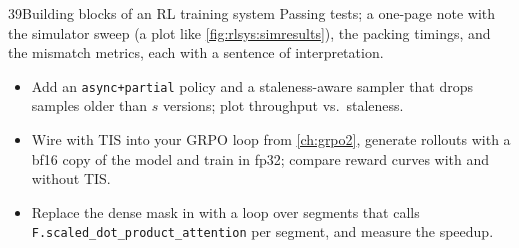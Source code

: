 \begin{labbox}{39}{Building blocks of an RL training system}
Passing tests; a one-page note with the simulator sweep (a plot like
\cref{fig:rlsys:simresults}), the packing timings, and the mismatch metrics, each with a
sentence of interpretation.

\begin{itemize}
\item Add an \texttt{async+partial} policy and a staleness-aware sampler that drops samples
older than $s$ versions; plot throughput vs.\ staleness.
\item Wire  with TIS into your GRPO loop from \cref{ch:grpo2}, generate
rollouts with a bf16 copy of the model and train in fp32; compare reward curves with and without
TIS.
\item Replace the dense mask in  with a loop over segments that calls
\texttt{F.scaled\_dot\_product\_attention} per segment, and measure the speedup.
\end{itemize}
\end{labbox}
